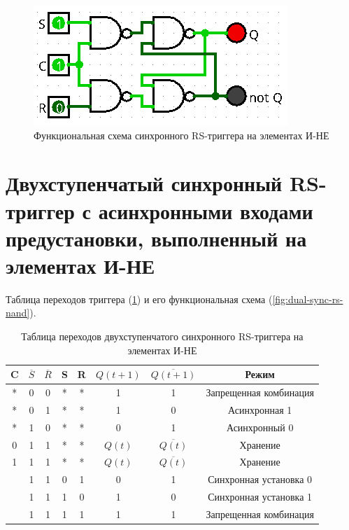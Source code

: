 \documentclass[14pt, a4paper]{extreport}
\newcommand\clockbt{%
	\begin{tikzpicture}[scale=0.25pt]
		\draw (0,0) -- (1,0) -- (1,1) -- (2,1);
	\end{tikzpicture}%
}
\begin{document}
\begin{figure}[H]
	\caption{Функциональная схема синхронного RS-триггера на элементах И-НЕ}
	\label{fig:sync-rs-nand}
	\includegraphics[width=\textwidth]{sync-rs-nand}
\end{figure}

\section{Двухступенчатый синхронный RS-триггер с асинхронными входами предустановки, выполненный на элементах И-НЕ}
Таблица переходов триггера (\cref{tab:dual-sync-rs-nand}) и его функциональная схема (\cref{fig:dual-sync-rs-nand}).

\begin{table}[H]
	\caption{Таблица переходов двухступенчатого синхронного RS-триггера на элементах И-НЕ}
	\label{tab:dual-sync-rs-nand}
	\begin{tabular}{|c|c|c|c|c|c|c|c|}
		\hline
		C & $\overline{S}$ & $\overline{R}$ & S & R & $Q(t + 1)$ & $\overline{Q(t + 1)}$ & Режим \\
		\hline
		* & 0 & 0 & * & * & 1 & 1 & Запрещенная комбинация \\
		\hline
		* & 0 & 1 & * & * & 1 & 0 & Асинхронная 1 \\
		\hline
		* & 1 & 0 & * & * & 0 & 1 & Асинхронный 0 \\
		\hline
		0 & 1 & 1 & * & * & $Q(t)$ & $\overline{Q(t)}$ & Хранение \\
		\hline
		1 & 1 & 1 & * & * & $Q(t)$ & $\overline{Q(t)}$ & Хранение \\
		\hline
		\clockbt & 1 & 1 & 0 & 1 & 0 & 1 & Синхронная установка 0 \\
		\hline
		\clockbt & 1 & 1 & 1 & 0 & 1 & 0 & Синхронная установка 1 \\
		\hline
		\clockbt & 1 & 1 & 1 & 1 & 1 & 1 & Запрещенная комбинация \\
		\hline
	\end{tabular}
\end{table}
\end{document}
